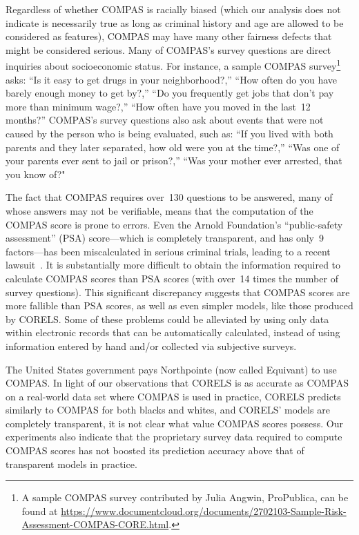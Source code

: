 \documentclass[twoside,11pt]{article}
\begin{document}
Regardless of whether COMPAS is racially biased (which our analysis does not indicate is necessarily true as long as criminal history and age are allowed to be considered as features),
COMPAS may have many other fairness defects that might be considered serious.
%
Many of COMPAS's survey questions are direct inquiries about socioeconomic status.
%
For instance, a sample COMPAS survey\footnote{A sample COMPAS survey contributed
by Julia Angwin, ProPublica, can be found at
\url{https://www.documentcloud.org/documents/2702103-Sample-Risk-Assessment-COMPAS-CORE.html}.} asks:
``Is it easy to get drugs in your neighborhood?,''
``How often do you have barely enough money to get by?,''
``Do you frequently get jobs that don't pay more than minimum wage?,''
``How often have you moved in the last~12 months?''
%
COMPAS's survey questions also ask about events that were not caused by the person who is being evaluated, such as:
``If you lived with both parents and they later separated, how old were you at the time?,''
``Was one of your parents ever sent to jail or prison?,''
``Was your mother ever arrested, that you know of?"

The fact that COMPAS requires over~130 questions to be answered, many of whose answers may not be verifiable, means that the computation of the COMPAS score is prone to errors.
%
Even the Arnold Foundation's ``public-safety assessment'' (PSA) score---which is completely transparent, and has only~9 factors---has been miscalculated in serious criminal trials, leading to a recent lawsuit~\citep{npr-bail:2017}.
%
It is substantially more difficult to obtain the information required to calculate COMPAS scores than PSA scores (with over~14 times the number of survey questions).
%
This significant discrepancy suggests that COMPAS scores are more fallible than PSA scores, as well as even simpler models, like those produced by CORELS.
%
Some of these problems could be alleviated by using only data within electronic records that can be automatically calculated, instead of using information entered by hand and/or collected via subjective surveys.

The United States government pays Northpointe (now called Equivant) to use COMPAS.
%
In light of our observations that CORELS is as accurate as COMPAS on a real-world data set where COMPAS is used in practice, CORELS predicts similarly to COMPAS for both blacks and whites, and CORELS' models are completely transparent, it is not clear what value COMPAS scores possess.
%
Our experiments also indicate that the proprietary survey data required to compute COMPAS scores has not boosted its prediction accuracy above that of transparent models in practice.
\end{document}
